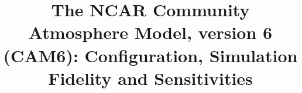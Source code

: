 \documentclass[linenumbers]{agujournal2018}
\begin{document}
\title{The NCAR Community Atmosphere Model, version 6 (CAM6): Configuration, Simulation Fidelity and Sensitivities}



\linenumbers
\modulolinenumbers[1]



















%


% 



%
\end{document}
